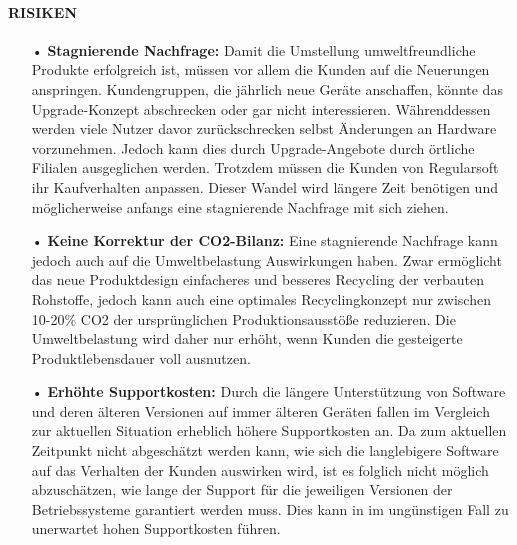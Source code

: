 \documentclass[12pt,titlepage]{article}
\begin{document}
\paragraph{RISIKEN}
\begin{itemize}
\item[•] \textbf{Stagnierende Nachfrage:}
Damit die Umstellung umweltfreundliche Produkte erfolgreich ist, müssen vor allem die Kunden auf die Neuerungen anspringen. Kundengruppen, die jährlich neue Geräte anschaffen, könnte das Upgrade-Konzept abschrecken oder gar nicht interessieren. Währenddessen werden viele Nutzer davor zurückschrecken selbst Änderungen an Hardware vorzunehmen. Jedoch kann dies durch Upgrade-Angebote durch örtliche Filialen ausgeglichen werden. Trotzdem müssen die Kunden von Regularsoft ihr Kaufverhalten anpassen. Dieser Wandel wird längere Zeit benötigen und möglicherweise anfangs eine stagnierende Nachfrage mit sich ziehen.
\item[•] \textbf{Keine Korrektur der CO2-Bilanz:}
 Eine stagnierende Nachfrage kann jedoch auch auf die Umweltbelastung Auswirkungen haben. Zwar ermöglicht das neue Produktdesign einfacheres und besseres Recycling der verbauten Rohstoffe, jedoch kann auch eine optimales Recyclingkonzept nur zwischen 10-20\% CO2 der ursprünglichen Produktionsausstöße reduzieren. Die Umweltbelastung wird daher nur erhöht, wenn Kunden die gesteigerte Produktlebensdauer voll ausnutzen.
\item[•] \textbf{Erhöhte Supportkosten:}
Durch die längere Unterstützung von Software und deren älteren Versionen auf immer älteren Geräten fallen im Vergleich zur aktuellen Situation erheblich höhere Supportkosten an. Da zum aktuellen Zeitpunkt nicht abgeschätzt werden kann, wie sich die langlebigere Software auf das Verhalten der Kunden auswirken wird, ist es folglich nicht möglich abzuschätzen, wie lange der Support für die jeweiligen Versionen der Betriebssysteme garantiert werden muss. Dies kann in im ungünstigen Fall zu unerwartet hohen Supportkosten führen.
\end{itemize}
\end{document}
